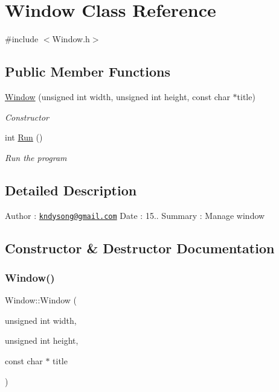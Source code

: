 \hypertarget{class_window}{}\section{Window Class Reference}
\label{class_window}


{\ttfamily \#include $<$Window.\+h$>$}

\subsection*{Public Member Functions}
\begin{DoxyCompactItemize}
\item 
\mbox{\hyperlink{class_window_a287f0a474d316ecdc3ec8e194d3488ca}{Window}} (unsigned int width, unsigned int height, const char $\ast$title)
\begin{DoxyCompactList}\small\item\em Constructor \end{DoxyCompactList}\item 
int \mbox{\hyperlink{class_window_a3f3589f1c4f61b5682201394fb8f398c}{Run}} ()
\begin{DoxyCompactList}\small\item\em Run the program \end{DoxyCompactList}\end{DoxyCompactItemize}


\subsection{Detailed Description}
Author \+: \href{mailto:kndysong@gmail.com}{\tt kndysong@gmail.\+com} Date \+: 15.. Summary \+: Manage window 

\subsection{Constructor \& Destructor Documentation}
\mbox{\label{class_window_a287f0a474d316ecdc3ec8e194d3488ca}} 
\subsubsection{\texorpdfstring{Window()}{Window()}}
{\footnotesize\ttfamily Window\+::\+Window (\begin{DoxyParamCaption}\item[{unsigned int}]{width,  }\item[{unsigned int}]{height,  }\item[{const char $\ast$}]{title }\end{DoxyParamCaption})}



